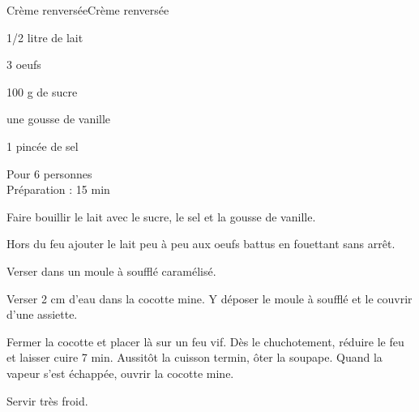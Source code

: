 \begin{recette}{Crème renversée}{Crème renversée}

\begin{ingredients}
1/2 litre de lait\par
3 oeufs\par
100 g de sucre\par
une gousse de vanille\par
1 pincée de sel\par
\end{ingredients}

\begin{infos}
Pour 6 personnes\\
Préparation : 15 min	\\
\end{infos}

\begin{etapes}
\item %
\item %
\item %
\item Faire bouillir le lait avec le sucre, le sel et la gousse de vanille.
\item Hors du feu ajouter le lait peu à peu aux oeufs battus en fouettant sans arrêt.
\item Verser dans un moule à soufflé caramélisé.
\item Verser 2 cm d'eau dans la cocotte mine. Y déposer le moule à soufflé et le couvrir d'une assiette.
\item Fermer la cocotte et placer là sur un feu vif. Dès le chuchotement, réduire le feu et laisser cuire 7 min. Aussitôt la cuisson termin, ôter la soupape. Quand la vapeur s'est échappée, ouvrir la cocotte mine.
\end{etapes}

\begin{conseils}
Servir très froid.
\end{conseils}

\end{recette}